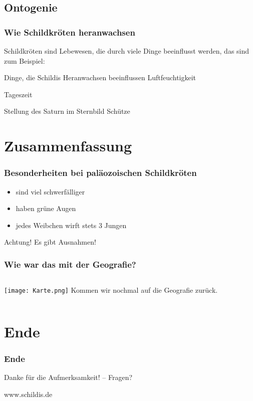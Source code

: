 \documentclass{beamer}
\begin{document}
\subsection{Ontogenie}

\begin{frame}
	\frametitle{Wie Schildkröten heranwachsen}

	Schildkröten sind Lebewesen, die durch viele Dinge beeinflusst werden, das sind zum Beispiel:
	
	\begin{exampleblock}{Dinge, die Schildis Heranwachsen beeinflussen} %
		Luftfeuchtigkeit
		
		Tageszeit
		
		Stellung des Saturn im Sternbild Schütze
	\end{exampleblock}

\end{frame}

\section{Zusammenfassung}

\begin{frame}
	\frametitle{Besonderheiten bei paläozoischen Schildkröten}
	
	\begin{itemize}
		\item sind viel schwerfälliger
		\item haben grüne Augen
		\item jedes Weibchen wirft stets 3 Jungen
	\end{itemize}
	
	\begin{alertblock}{Achtung!} %
		Es gibt Ausnahmen!
	\end{alertblock}
\end{frame}

\begin{frame}
	\frametitle{Wie war das mit der Geografie?}
	
	\begin{columns} %
		\column[c]{6cm} %
			\texttt{[image: Karte.png]}
			Kommen wir nochmal auf die Geografie zurück.
	\end{columns}	
\end{frame}

\section{Ende}

\begin{frame}
	\frametitle{Ende}
	\begin{center}
	Danke für die Aufmerksamkeit! -- Fragen? \vspace{0.3cm}

	
	{\footnotesize www.schildis.de}
	\end{center}
\end{frame}
\end{document}
